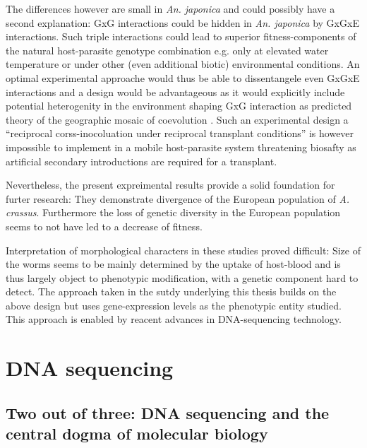 The differences however are small in \textit{An. japonica} and could
possibly have a second explanation: GxG interactions could be hidden
in \textit{An. japonica} by GxGxE interactions. Such triple
interactions could lead to superior fitness-components of the natural
host-parasite genotype combination e.g. only at elevated water
temperature or under other (even additional biotic) environmental
conditions. An optimal experimental approache would thus be able to
dissentangele even GxGxE interactions and a design would be
advantageous as it would explicitly include potential heterogenity in
the environment shaping GxG interaction as predicted theory of the
geographic mosaic of coevolution \cite{thompson2005geographic}. Such
an experimental design a ``reciprocal corss-inocoluation under
reciprocal transplant conditions'' \cite{pmid18419564} is however
impossible to implement in a mobile host-parasite system threatening
biosafty as artificial secondary introductions are required for a
transplant.

Nevertheless, the present expreimental results provide a solid
foundation for furter research: They demonstrate divergence of the
European population of \textit{A. crassus}. Furthermore the loss of
genetic diversity in the European population
\cite{wielgoss_population_2008} seems to not have led to a decrease of
fitness.

Interpretation of morphological characters in these studies proved
difficult: Size of the worms seems to be mainly determined by the
uptake of host-blood and is thus largely object to phenotypic
modification, with a genetic component hard to detect. The approach
taken in the sutdy underlying this thesis builds on the above design
but uses gene-expression levels as the phenotypic entity studied. This
approach is enabled by reacent advances in DNA-sequencing technology.

\section{DNA sequencing}


\subsection{Two out of three: DNA sequencing and the central dogma of
  molecular biology}
\label{sec:dm}



